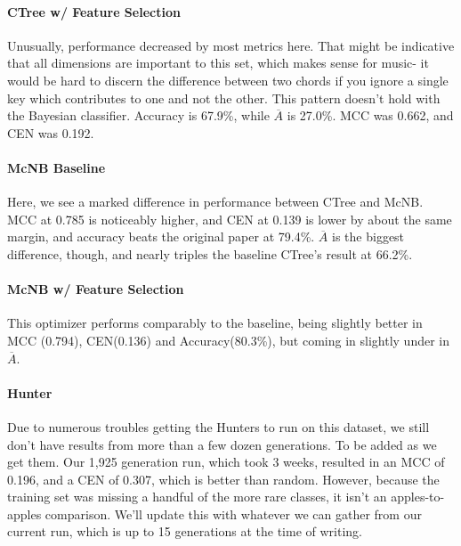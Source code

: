 \paragraph{CTree w/ Feature Selection}	
Unusually, performance decreased by most metrics here.  That might be indicative that all dimensions are important to this set, which makes sense for music- it would be hard to discern the difference between two chords if you ignore a single key which contributes to one and not the other.  This pattern doesn't hold with the Bayesian classifier.  Accuracy is 67.9\%, while $\overline{A}$ is 27.0\%.    MCC was 0.662, and CEN was 0.192.
\paragraph{McNB Baseline}
Here, we see a marked difference in performance between CTree and McNB.  MCC at 0.785 is noticeably higher, and CEN at 0.139 is lower by about the same margin, and accuracy beats the original paper at 79.4\%.  $\overline{A}$ is the biggest difference, though, and nearly triples the baseline CTree's result at 66.2\%.
\paragraph{McNB w/ Feature Selection}
This optimizer performs comparably to the baseline, being slightly better in MCC (0.794), CEN(0.136) and Accuracy(80.3\%), but coming in slightly under in $\overline{A}$.  
\paragraph{Hunter}
Due to numerous troubles getting the Hunters to run on this dataset, we still don't have results from more than a few dozen generations.  To be added as we get them.  Our 1,925 generation run, which took 3 weeks, resulted in an MCC of 0.196, and a CEN of 0.307, which is better than random.  However, because the training set was missing a handful of the more rare classes, it isn't an apples-to-apples comparison.  We'll update this with whatever we can gather from our current run, which is up to 15 generations at the time of writing.

